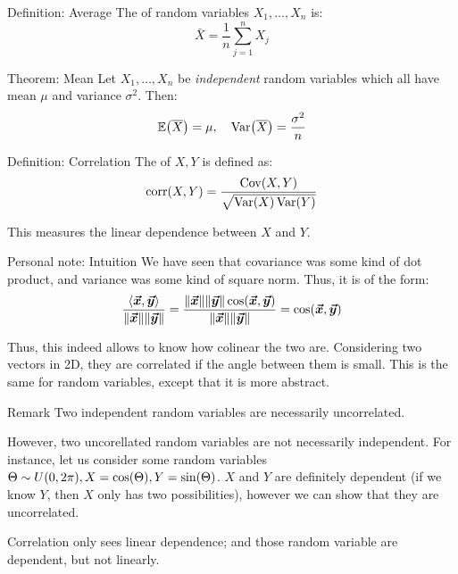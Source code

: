 \documentclass[a4paper]{article}
\begin{document}
\begin{parag}{Definition: Average}
    The  of random variables $X_1, \ldots, X_n$ is: 
    \[\bar{X} = \frac{1}{n} \sum_{j=1}^{n} X_j\]
\end{parag}

\begin{parag}{Theorem: Mean}
    Let $X_1, \ldots, X_n$ be \textit{independent} random variables which all have mean $\mu$ and variance $\sigma ^2$. Then: 
    \[\exval\left(\bar{X}\right) = \mu, \mathspace \Var\left(\bar{X}\right) = \frac{\sigma ^2}{n}\]
\end{parag}

\begin{parag}{Definition: Correlation}
    The  of $X, Y$ is defined as: 
    \[\corr\left(X, Y\right) = \frac{\Cov\left(X, Y\right)}{\sqrt{\Var\left(X\right)\Var\left(Y\right)}}\]
    
    This measures the linear dependence between $X$ and $Y$. 

    \begin{subparag}{Personal note: Intuition}
        We have seen that covariance was some kind of dot product, and variance was some kind of square norm. Thus, it is of the form: 
        \[\frac{\left\langle \bvec{x}, \bvec{y} \right\rangle}{\left\|\bvec{x}\right\|\left\|\bvec{y}\right\|} = \frac{\left\|\bvec{x}\right\|\left\|\bvec{y}\right\| \cos\left(\bvec{x}, \bvec{y}\right)}{\left\|\bvec{x}\right\|\left\|\bvec{y}\right\|} = \cos\left(\bvec{x}, \bvec{y}\right)\]
        
        Thus, this indeed allows to know how colinear the two are. Considering two vectors in 2D, they are correlated if the angle between them is small. This is the same for random variables, except that it is more abstract.
    \end{subparag}
    
\end{parag}

\begin{parag}{Remark}
    Two independent random variables are necessarily uncorrelated.

    However, two uncorellated random variables are not necessarily independent. For instance, let us consider some random variables $\Theta \followsdistr U\left(0, 2\pi\right), X = \cos\left(\Theta\right), Y = \sin\left(\Theta\right)$. $X$ and $Y$ are definitely dependent (if we know $Y$, then $X$ only has two possibilities), however we can show that they are uncorrelated.

    Correlation only sees linear dependence; and those random variable are dependent, but not linearly.
\end{parag}
\end{document}
